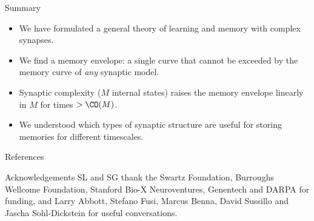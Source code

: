 \documentclass[final,hyperref={pdfpagelabels=false,bookmarks=false}]{beamer}
\begin{document}
\begin{frame}{}
\begin{columns}[t]
\begin{column}{0.33\linewidth}

\begin{block}{Summary}
%
  \begin{itemize}
    \item We have formulated a general theory of learning and memory with complex synapses.
    \item We find a memory envelope: a single curve that cannot be exceeded by the memory curve of \emph{any} synaptic model.
    \item    Synaptic complexity ($M$ internal states) raises the memory envelope linearly in $M$ for times $> \CO(M)$.
    \item We understood which types of synaptic structure are useful for storing memories for different timescales.
  \end{itemize}
%
\end{block}


\begin{block}{References}
%
 {\tiny
 
 
 }
%
\end{block}


\begin{block}{Acknowledgements}
%
 SL and SG thank the Swartz Foundation, Burroughs Wellcome Foundation, Stanford Bio-X Neuroventures, Genentech and DARPA for funding, and Larry Abbott, Stefano Fusi, Marcus Benna, David Sussillo and Jascha Sohl-Dickstein for useful conversations.

%
\end{block}


\end{column}





\end{columns}

\end{frame}
\end{document}
